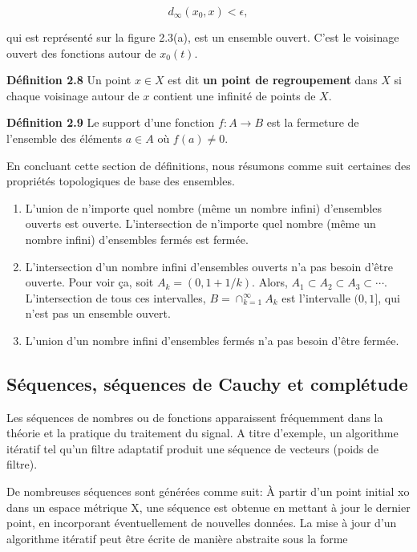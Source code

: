 \documentclass[10pt,twoside,a4paper]{book}
\begin{document}
\begin{equation*}
  d_\infty(x_0, x) < \epsilon,
\end{equation*}

\noindent
qui est représenté sur la figure 2.3(a), est un ensemble ouvert. C'est le voisinage ouvert des fonctions autour de $x_0(t)$.

\vspace{4mm}
\noindent
\textbf{Définition 2.8} Un point $x \in X$ est dit \textbf{un point de regroupement} dans $X$ si chaque voisinage autour de $x$ contient une infinité de points de $X$.

\vspace{4mm}
\noindent
\textbf{Définition 2.9} Le support d'une fonction $f:A \longrightarrow B$ est la fermeture de l'ensemble des éléments $a \in A$ où $f(a) \neq 0$.

\vspace{2mm}
En concluant cette section de définitions, nous résumons comme suit certaines des propriétés topologiques de base des ensembles.

\begin{enumerate}
  \item L'union de n'importe quel nombre (même un nombre infini) d'ensembles ouverts est ouverte. L'intersection de n'importe quel nombre (même un nombre infini) d'ensembles fermés est fermée.
  \item L'intersection d'un nombre infini d'ensembles ouverts n'a pas besoin d'être ouverte. Pour voir ça, soit $A_k = (0, 1 + 1/k)$. Alors, $A_1 \subset A_2 \subset A_3 \subset \cdots$.
  L'intersection de tous ces intervalles, $B = \cap_{k=1}^{\infty} A_k$ est l'intervalle $(0, 1]$, qui n'est pas un ensemble ouvert.
  \item L'union d'un nombre infini d'ensembles fermés n'a pas besoin d'être fermée.
\end{enumerate}

\subsection{Séquences, séquences de Cauchy et complétude}
\noindent
Les séquences de nombres ou de fonctions apparaissent fréquemment dans la théorie et la pratique du traitement du signal. A titre d'exemple, un algorithme itératif tel qu'un filtre adaptatif produit une séquence de vecteurs (poids de filtre).

De nombreuses séquences sont générées comme suit: À partir d'un point initial xo dans un espace métrique X, une séquence est obtenue en mettant à jour le dernier point, en incorporant éventuellement de nouvelles données. La mise à jour d'un algorithme itératif peut être écrite de manière abstraite sous la forme
\end{document}
